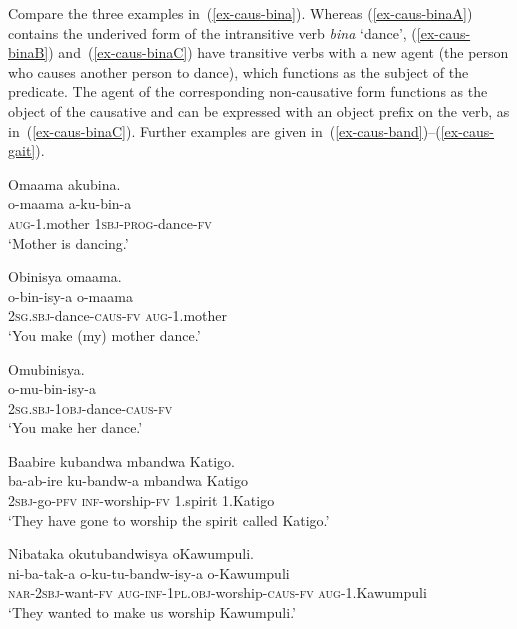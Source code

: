 Compare the three examples in~(\ref{ex-caus-bina}). Whereas (\ref{ex-caus-binaA}) contains the underived form of the intransitive verb \emph{bina} `dance', (\ref{ex-caus-binaB}) and~(\ref{ex-caus-binaC}) have transitive verbs with a new agent (the person who causes another person to dance), which functions as the subject of the predicate. 
The agent of the corresponding non-causative form functions as the object of the causative and can be expressed with an object prefix on the verb, as in~(\ref{ex-caus-binaC}). 
Further examples are given in~(\ref{ex-caus-band})–(\ref{ex-caus-gait}).

\ea \label{ex-caus-bina}
\begin{xlist}

\ex \label{ex-caus-binaA}
	\glll Omaama akubina.\\
	  o-maama a-ku-bin-a\\
		\textsc{aug}-1.mother \textsc{1sbj}-\textsc{prog}-dance-\textsc{fv}\\
	\glt ‘Mother is dancing.'

\ex \label{ex-caus-binaB}
	\glll Obinisya omaama.\\
	  o-bin-isy-a o-maama\\
		2\textsc{sg.sbj}-dance-\textsc{caus}-\textsc{fv} \textsc{aug}-1.mother\\
	\glt ‘You make (my) mother dance.'

\ex \label{ex-caus-binaC}
	\glll Omubinisya.\\
	  o-mu-bin-isy-a\\
		2\textsc{sg.sbj}-\textsc{1obj}-dance-\textsc{caus}-\textsc{fv}\\
	\glt ‘You make her dance.'
\end{xlist}
\z

\ea \label{ex-caus-band}
\begin{xlist}

	\ex \label{ex-caus-bazaA}
	\glll Baabire kubandwa mbandwa Katigo.\\
	  ba-ab-ire ku-bandw-a mbandwa Katigo\\
		\textsc{2sbj}-go-\textsc{pfv}	\textsc{inf}-worship-\textsc{fv} 1.spirit 1.Katigo\\
	\glt ‘They have gone to worship the spirit called Katigo.' 
	
	\ex \label{ex-caus-bazaB}
	\glll Nibataka  { }   { }  okutubandwisya { }  { }  oKawumpuli.\\
	  ni-ba-tak-a  { }   { }  o-ku-tu-bandw-isy-a  { }  { }  o-Kawumpuli\\
		\textsc{nar}-\textsc{2sbj}-want-\textsc{fv}  { }   { }  \textsc{aug}-\textsc{inf}-\textsc{1pl.obj}-worship-\textsc{caus}-\textsc{fv}  { } { }  \textsc{aug}-1.Kawumpuli\\
	\glt ‘They wanted to make us worship Kawumpuli.’
	

\end{xlist}
\z
	
